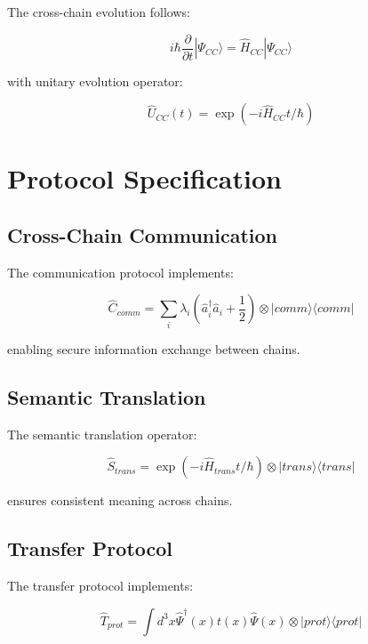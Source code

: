 \documentclass[12pt]{article}
\begin{document}
The cross-chain evolution follows:

\begin{equation}
i\hbar\frac{\partial}{\partial t}|\Psi_{CC}\rangle = \hat{H}_{CC}|\Psi_{CC}\rangle
\end{equation}

with unitary evolution operator:

\begin{equation}
\hat{U}_{CC}(t) = \exp(-i\hat{H}_{CC}t/\hbar)
\end{equation}

\section{Protocol Specification}

\subsection{Cross-Chain Communication}

The communication protocol implements:

\begin{equation}
\hat{C}_{comm} = \sum_i \lambda_i(\hat{a}_i^\dagger\hat{a}_i + \frac{1}{2}) \otimes |comm\rangle\langle comm|
\end{equation}

enabling secure information exchange between chains.

\subsection{Semantic Translation}

The semantic translation operator:

\begin{equation}
\hat{S}_{trans} = \exp(-i\hat{H}_{trans}t/\hbar) \otimes |trans\rangle\langle trans|
\end{equation}

ensures consistent meaning across chains.

\subsection{Transfer Protocol}

The transfer protocol implements:

\begin{equation}
\hat{T}_{prot} = \int d^3x \hat{\Psi}^\dagger(x)t(x)\hat{\Psi}(x) \otimes |prot\rangle\langle prot|
\end{equation}
\end{document}
